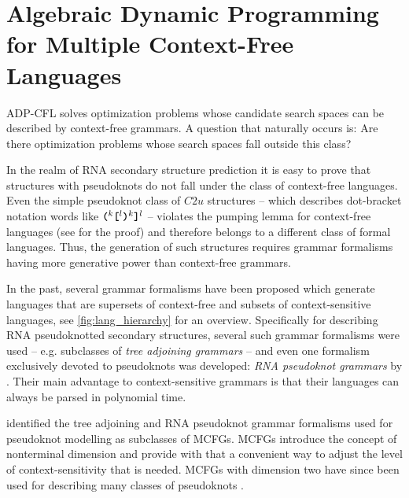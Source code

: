 \documentclass[
    a4paper,
    12pt,
    twoside,
    BCOR=12mm,
    parskip=half,
    chapterprefix,
    numbers=noenddot,
    bibliography=totoc
]{scrbook}
\begin{document}
\chapter[\texorpdfstring{Algebraic Dynamic Programming for Multiple Context-Free\newline Languages}{ADP-MCFL}]{Algebraic Dynamic Programming for Multiple Context-Free Languages}
\label{ch:adp-mcfl}

ADP-CFL solves optimization problems whose candidate search spaces can be described by context-free grammars. A question that naturally occurs is: Are there optimization problems whose search spaces fall outside this class?

In the realm of RNA secondary structure prediction it is easy to prove that structures with pseudoknots do not fall under the class of context-free languages. Even the simple pseudoknot class of $C2u$ structures -- which describes dot-bracket notation words like $\ts{(}^k \ts{[}^l \ts{)}^k \ts{]}^l$ -- violates the pumping lemma for context-free languages (see \citet[p. 279]{hopcroft_introduction_2001} for the proof) and therefore belongs to a different class of formal languages. Thus, the generation of such structures requires grammar formalisms having more generative power than context-free grammars.

In the past, several grammar formalisms have been proposed which generate languages that are supersets of context-free and subsets of context-sensitive languages, see \cref{fig:lang_hierarchy} for an overview. Specifically for describing RNA pseudoknotted secondary structures, several such grammar formalisms were used -- e.g. subclasses of \emph{tree adjoining grammars} \citep{uemura_tree_1999} -- and even one formalism exclusively devoted to pseudoknots was developed: \emph{RNA pseudoknot grammars} by \citet{rivas_language_2000}. Their main advantage to context-sensitive grammars is that their languages can always be parsed in polynomial time.

\citet{kato_generative_2005} identified the tree adjoining and RNA pseudoknot grammar formalisms used for pseudoknot modelling as subclasses of \glspl{MCFG}. \Glspl{MCFG} introduce the concept of nonterminal dimension and provide with that a convenient way to adjust the level of context-sensitivity that is needed. \Glspl{MCFG} with dimension two have since been used for describing many classes of pseudoknots \citep{reidys_topology_2011,nebel_algebraic_2012}.
\end{document}
